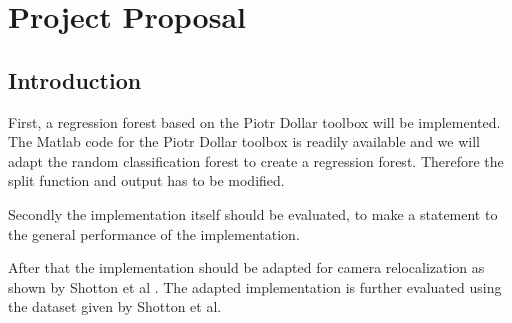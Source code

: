 %





\newcommand{\TUGn}{Graz University of Technology}

\address[ICG]{Inst. for Computer Graphics and Vision \\ \TUGn, Austria}



















\section{Project Proposal}

\subsection{Introduction} %
\label{sub:intro}
First, a regression forest based on the Piotr Dollar toolbox \cite{piotr} will be implemented. The Matlab code for the Piotr Dollar toolbox is readily available and we will adapt the random classification forest to create a regression forest. Therefore the split function and output has to be modified.

Secondly the implementation itself should be evaluated, to make a statement to the general performance of the implementation.

After that the implementation should be adapted for camera relocalization as shown by Shotton et al \cite{shotton} . The adapted implementation is further evaluated using the dataset given by Shotton et al.

